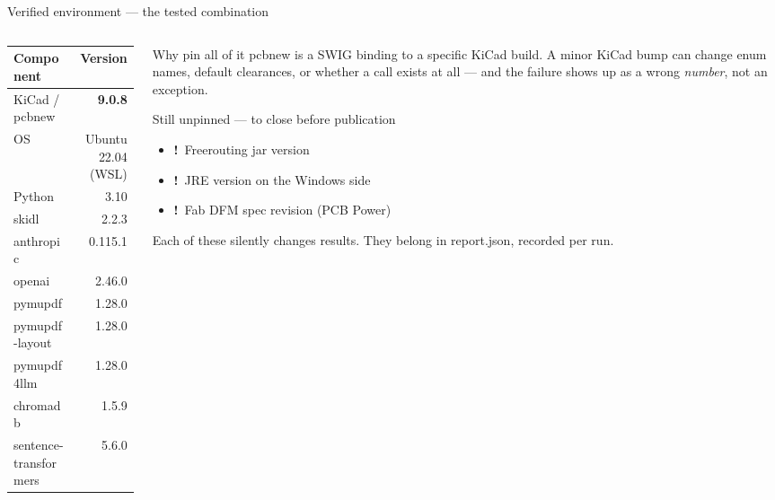 \documentclass[aspectratio=169,10pt]{beamer}
\newcommand{\gap}{{\color{stamber}\textbf{!}}}
\newcommand{\code}[1]{{\ttfamily\small #1}}
\begin{document}
\begin{frame}{Verified environment --- the tested combination}
\vspace{-1mm}
\begin{columns}[T]
\begin{column}{0.50\textwidth}
\begin{center}\footnotesize
\begin{tabular}{@{}l r@{}}
\toprule
\textbf{Component} & \textbf{Version}\\
\midrule
KiCad / \code{pcbnew} & \textbf{9.0.8}\\
OS & Ubuntu 22.04 (WSL)\\
Python & 3.10\\
\midrule
\code{skidl} & 2.2.3\\
\code{anthropic} & 0.115.1\\
\code{openai} & 2.46.0\\
\code{pymupdf} & 1.28.0\\
\code{pymupdf-layout} & 1.28.0\\
\code{pymupdf4llm} & 1.28.0\\
\code{chromadb} & 1.5.9\\
\code{sentence-transformers} & 5.6.0\\
\bottomrule
\end{tabular}
\end{center}
\end{column}
\begin{column}{0.47\textwidth}
\begin{block}{Why pin all of it}
\small
\code{pcbnew} is a SWIG binding to a specific KiCad build. A minor KiCad bump can change enum names, default clearances, or whether a call exists at all --- and the failure shows up as a wrong \emph{number}, not an exception.
\end{block}
\vspace{1mm}
\begin{block}{Still unpinned --- to close before publication}
\small
\begin{itemize}\footnotesize
  \item \gap\ Freerouting jar version
  \item \gap\ JRE version on the Windows side
  \item \gap\ Fab DFM spec revision (PCB Power)
\end{itemize}
Each of these silently changes results. They belong in \code{report.json}, recorded per run.
\end{block}
\end{column}
\end{columns}
\end{frame}
\end{document}
